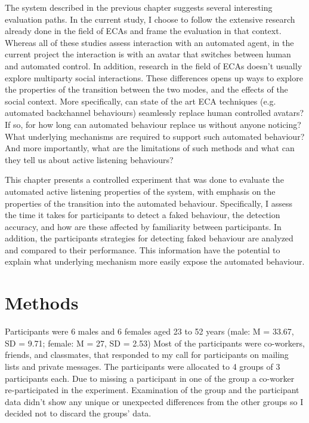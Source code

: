 \documentclass[]{simple-thesis}
\begin{document}
The system described in the previous chapter suggests several interesting evaluation paths.
In the current study, I choose to follow the extensive research already done in the field of ECAs \citep{Nishimura2007, Bevacqua2008, Gratch2007, Huang2011, Lee2006, Poppe2013} and frame the evaluation in that context.
Whereas all of these studies assess interaction with an automated agent, in the current project the interaction is with an avatar that switches between human and automated control.
In addition, research in the field of ECAs doesn't usually explore multiparty social interactions.
These differences opens up ways to explore the properties of the transition between the two modes, and the effects of the social context.
More specifically, can state of the art ECA techniques (e.g. automated backchannel behaviours) seamlessly replace human controlled avatars?
If so, for how long can automated behaviour replace us without anyone noticing?
What underlying mechanisms are required to support such automated behaviour?
And more importantly, what are the limitations of such methods and what can they tell us about active listening behaviours?

This chapter presents a controlled experiment that was done to evaluate the automated active listening properties of the system, with emphasis on the properties of the transition into the automated behaviour.
Specifically, I assess the time it takes for participants to detect a faked behaviour, the detection accuracy, and how are these affected by familiarity between participants.
In addition, the participants strategies for detecting faked behaviour are analyzed and compared to their performance.
This information have the potential to explain what underlying mechanism more easily expose the automated behaviour.

\section{Methods}

Participants were 6 males and 6 females aged 23 to 52 years (male: M = 33.67, SD = 9.71; female: M = 27, SD = 2.53)
Most of the participants were co-workers, friends, and classmates, that responded to my call for participants on mailing lists and private messages.
The participants were allocated to 4 groups of 3 participants each.
Due to missing a participant in one of the group a co-worker re-participated in the experiment.
Examination of the group and the participant data didn't show any unique or unexpected differences from the other groups so I decided not to discard the groups' data.
\end{document}
